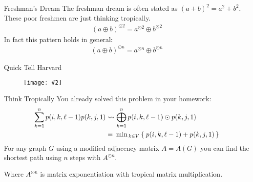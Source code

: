 \documentclass[usenames,dvipsnames]{beamer}
\newcommand{\pic}[2]{\texttt{[image: \#2]}}
\newcommand{\minF}[1]{\ensuremath{\text{min}\{ \, #1 \, \}}}
\begin{document}
\begin{frame}{Freshman's Dream}
  The freshman dream is often stated as $(a + b)^2 = a^2 + b^2$. These poor
  freshmen are just thinking tropically.
  \begin{align*}
    (a \oplus b)^{\odot 2} = a^{\odot 2} \oplus b^{\odot 2}
  \end{align*}
  In fact this pattern holds in general:
  \begin{align*}
    (a \oplus b)^{\odot n} = a^{\odot n} \oplus b^{\odot n}
  \end{align*}
\end{frame}
\begin{frame}{Quick Tell Harvard}
  \begin{figure}
    \pic{1}{lil-pump.jpg}
  \end{figure}
\end{frame}
\begin{frame}{Think Tropically}
  You already solved this problem in your homework:
  \begin{align*}
    \sum_{k=1}^np(i,k,\ell - 1)p(k,j,1)
    &\rightsquigarrow \bigoplus_{k=1}^{n} p(i,k,\ell - 1)\odot p(k,j,1) \\
    &= \kern0.2em \text{min}_{\, k \in V} \left \{ \: p(i, k, \ell - 1) + p(k, j, 1) \, \right \}
  \end{align*}
  For any graph $G$ using a modified adjacency matrix $A = A(G)$ you can find
  the shortest path using $n$ steps with $A^{\odot n}$.

  Where $A^{\odot n}$ is matrix exponentiation with tropical matrix multiplication.
\end{frame}
\end{document}
